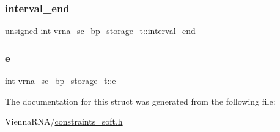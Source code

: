 \subsubsection{\texorpdfstring{interval\+\_\+end}{interval\_end}}
{\footnotesize\ttfamily unsigned int vrna\+\_\+sc\+\_\+bp\+\_\+storage\+\_\+t\+::interval\+\_\+end}

\mbox{\label{structvrna__sc__bp__storage__t_a377405c7607c69c7f58baab0b06092eb}} 
\subsubsection{\texorpdfstring{e}{e}}
{\footnotesize\ttfamily int vrna\+\_\+sc\+\_\+bp\+\_\+storage\+\_\+t\+::e}



The documentation for this struct was generated from the following file\+:\begin{DoxyCompactItemize}
\item 
Vienna\+R\+N\+A/\mbox{\hyperlink{constraints__soft_8h}{constraints\+\_\+soft.\+h}}\end{DoxyCompactItemize}
